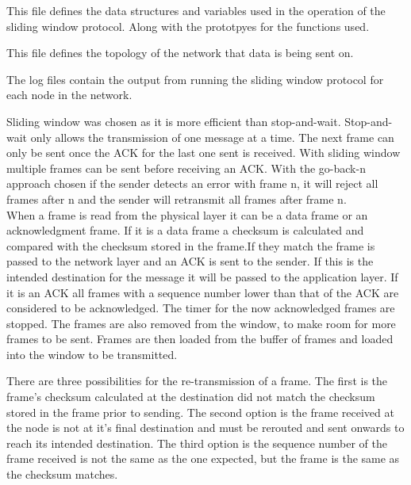 \documentclass{worksheet}
\begin{document}
This file defines the data structures and variables used in the operation of the sliding window protocol. Along with the prototpyes for the functions used.


This file defines the topology of the network that data is being sent on. \newline




\noindent The log files contain the output from running the sliding window protocol for each node in the network. 


Sliding window was chosen as it is more efficient than stop-and-wait. Stop-and-wait only allows the transmission of one message at a time. The next frame can only be sent once the ACK for the last one sent is received. With sliding window multiple frames can be sent before receiving an ACK. With the go-back-n approach chosen if the sender detects an error with frame n, it will reject all frames after n and the sender will retransmit all frames after frame n.  \\



When a frame is read from the physical layer it can be a data frame or an acknowledgment frame.
If it is a data frame a checksum is calculated and compared with the checksum stored in the frame.If they match the frame is passed to the network layer and an ACK is sent to the sender. If this is the intended destination for the message it will be passed to the application layer.
If it is an ACK all frames with a sequence number lower than that of the ACK are considered to be acknowledged. The timer for the now acknowledged frames are stopped. The frames are also removed from the window, to make room for more frames to be sent. Frames are then loaded from the buffer of frames and loaded into the window to be transmitted. 


There are three possibilities for the re-transmission of a frame. The first is the frame's checksum calculated at the destination did not match the checksum stored in the frame prior to sending. The second option is the frame received at the node is not at it's final destination and must be rerouted and sent onwards to reach its intended destination. The third option is the sequence number of the frame received is not the same as the one expected, but the frame is the same as the checksum matches. 
\end{document}

